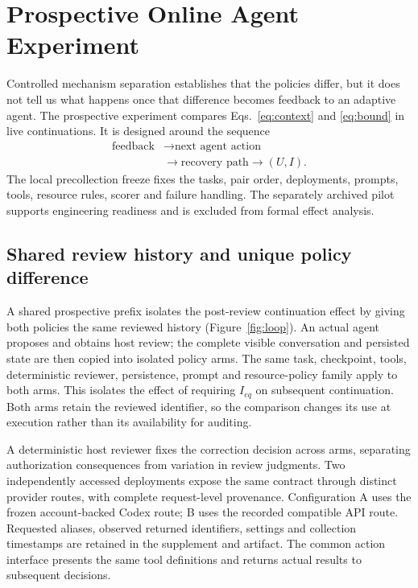 \documentclass[10pt,a4paper,twocolumn]{article}
\begin{document}
\section{Prospective Online Agent Experiment}
Controlled mechanism separation establishes that the policies differ, but it does not tell us what happens once that difference becomes feedback to an adaptive agent. The prospective experiment compares Eqs.~\ref{eq:context} and \ref{eq:bound} in live continuations. It is designed around the sequence
\begin{equation}
\begin{aligned}
\text{feedback}&\to\text{next agent action}\\
&\to\text{recovery path}\to(U,I).
\end{aligned}
\end{equation}
The local precollection freeze fixes the tasks, pair order, deployments, prompts, tools, resource rules, scorer and failure handling. The separately archived pilot supports engineering readiness and is excluded from formal effect analysis.

\subsection{Shared review history and unique policy difference}
A shared prospective prefix isolates the post-review continuation effect by giving both policies the same reviewed history (Figure~\ref{fig:loop}). An actual agent proposes and obtains host review; the complete visible conversation and persisted state are then copied into isolated policy arms. The same task, checkpoint, tools, deterministic reviewer, persistence, prompt and resource-policy family apply to both arms. This isolates the effect of requiring $I_{eq}$ on subsequent continuation. Both arms retain the reviewed identifier, so the comparison changes its use at execution rather than its availability for auditing.

A deterministic host reviewer fixes the correction decision across arms, separating authorization consequences from variation in review judgments. Two independently accessed deployments expose the same contract through distinct provider routes, with complete request-level provenance. Configuration A uses the frozen account-backed Codex route; B uses the recorded compatible API route. Requested aliases, observed returned identifiers, settings and collection timestamps are retained in the supplement and artifact. The common action interface presents the same tool definitions and returns actual results to subsequent decisions.
\end{document}

